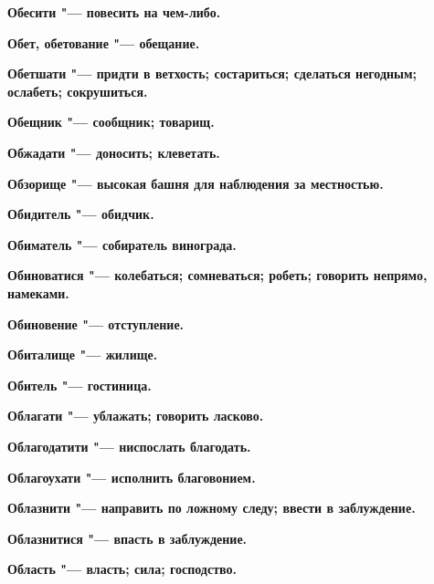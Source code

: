 \bfseries Обесити \normalfont{} "--- повесить на чем-либо. 




\bfseries Обет, обетование \normalfont{} "--- обещание. 




\bfseries Обетшати \normalfont{} "--- придти в ветхость; состариться; сделаться негодным; ослабеть; сокрушиться. 




\bfseries Обещник \normalfont{} "--- сообщник; товарищ. 




\bfseries Обжадати \normalfont{} "--- доносить; клеветать. 




\bfseries Обзорище \normalfont{} "--- высокая башня для наблюдения за местностью. 




\bfseries Обидитель \normalfont{} "--- обидчик. 




\bfseries Обиматель \normalfont{} "--- собиратель винограда. 




\bfseries Обиноватися \normalfont{} "--- колебаться; сомневаться; робеть; говорить непрямо, намеками. 




\bfseries Обиновение \normalfont{} "--- отступление. 




\bfseries Обиталище \normalfont{} "--- жилище. 




\bfseries Обитель \normalfont{} "--- гостиница. 




\bfseries Облагати \normalfont{} "--- ублажать; говорить ласково. 




\bfseries Облагодатити \normalfont{} "--- ниспослать благодать. 




\bfseries Облагоухати \normalfont{} "--- исполнить благовонием. 




\bfseries Облазнити \normalfont{} "--- направить по ложному следу; ввести в заблуждение. 




\bfseries Облазнитися \normalfont{} "--- впасть в заблуждение. 




\bfseries Область \normalfont{} "--- власть; сила; господство. 




